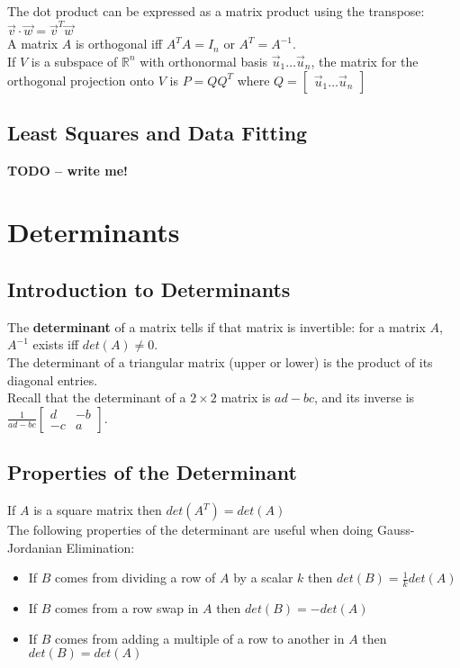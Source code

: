 \documentclass[]{scrartcl}
\begin{document}
	The dot product can be expressed as a matrix product using the transpose: $\vec{v} \cdot \vec{w} = \vec{v}^T \vec{w}$\\
	
	A matrix $A$ is orthogonal iff $ A^T A = I_n$ or $A^T = A^{-1} $.\\
	
	If $V$ is a subspace of $\mathbb{R}^n$ with orthonormal basis $\vec{u}_1 \ldots \vec{u}_n$, the matrix for the orthogonal projection onto $V$ is $P = Q Q^T$ where $Q = \begin{bmatrix}
	\vec{u}_1 \ldots \vec{u}_n
	\end{bmatrix}$
	
	\subsection{Least Squares and Data Fitting}
	\textbf{TODO -- write me!}
	
	\setcounter{section}{5}
	\section{Determinants}
	\subsection{Introduction to Determinants}
	The \textbf{determinant} of a matrix tells if that matrix is invertible: for a matrix $A$, $A^{-1}$ exists iff $det(A) \neq 0$.\\
	
	The determinant of a triangular matrix (upper or lower) is the product of its diagonal entries.\\
	
	Recall that the determinant of a $2 \times 2$ matrix is $ad - bc$, and its inverse is $\frac{1}{ad-bc} \begin{bmatrix}
	d & -b\\
	-c & a
	\end{bmatrix}$.\\
	
	\subsection{Properties of the Determinant}
	If $A$ is a square matrix then $det(A^T) = det(A)$\\
	
	The following properties of the determinant are useful when doing Gauss-Jordanian Elimination:
	\begin{itemize}
		\item If $B$ comes from dividing a row of $A$ by a scalar $k$ then $det(B) = \frac{1}{k} det(A)$
		\item If $B$ comes from a row swap in $A$ then $det(B) = -det(A)$
		\item If $B$ comes from adding a multiple of a row to another in $A$ then $det(B) = det(A)$
	\end{itemize}
	
\end{document}
